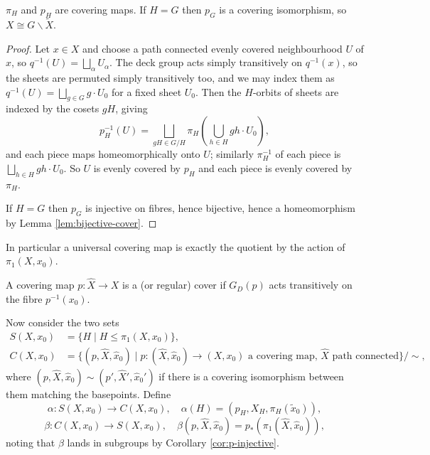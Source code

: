 \begin{proposition} \label{prop:quotient-cover}
	$\pi_H$ and $p_H$ are covering maps. If $H = G$ then $p_G$ is a covering isomorphism, so $X \cong G\backslash\widetilde X$.
\end{proposition}
\begin{proof}
	Let $x \in X$ and choose a path connected evenly covered neighbourhood $U$ of $x$, so $q^{-1}(U) = \bigsqcup_\alpha U_\alpha$. The deck group acts simply transitively on $q^{-1}(x)$, so the sheets are permuted simply transitively too, and we may index them as $q^{-1}(U) = \bigsqcup_{g \in G} g \cdot U_0$ for a fixed sheet $U_0$. Then the $H$-orbits of sheets are indexed by the cosets $gH$, giving
	$$
	p_H^{-1}(U) = \bigsqcup_{gH \in G/H} \pi_H\!\left(\textstyle\bigcup_{h\in H} gh\cdot U_0\right),
	$$
	and each piece maps homeomorphically onto $U$; similarly $\pi_H^{-1}$ of each piece is $\bigsqcup_{h \in H} gh \cdot U_0$. So $U$ is evenly covered by $p_H$ and each piece is evenly covered by $\pi_H$.

	If $H = G$ then $p_G$ is injective on fibres, hence bijective, hence a homeomorphism by Lemma \ref{lem:bijective-cover}.
\end{proof}

In particular a universal covering map is exactly the quotient by the action of
$\pi_1(X, x_0)$.

\begin{definition}
	A covering map $p: \hat X \to X$ is a  (or regular) cover if $G_D(p)$ acts transitively on the fibre $p^{-1}(x_0)$.
\end{definition}

Now consider the two sets
\begin{align*}
	S(X, x_0) &= \{H \mid H \leq \pi_1(X,x_0)\}, \\
	C(X, x_0) &= \{(p, \hat X, \hat x_0) \mid p: (\hat X, \hat x_0) \to (X,x_0) \text{ a covering map, } \hat X \text{ path connected}\}/\!\sim,
\end{align*}
where $(p, \hat X, \hat x_0) \sim (p', \hat X', \hat x_0')$ if there is a covering
isomorphism between them matching the basepoints. Define
$$
\alpha: S(X,x_0) \to C(X,x_0), \quad \alpha(H) = (p_H, X_H, \pi_H(\tilde x_0)),
$$
$$
\beta: C(X,x_0) \to S(X,x_0), \quad \beta(p, \hat X, \hat x_0) = p_*(\pi_1(\hat X, \hat x_0)),
$$
noting that $\beta$ lands in subgroups by Corollary \ref{cor:p-injective}.

